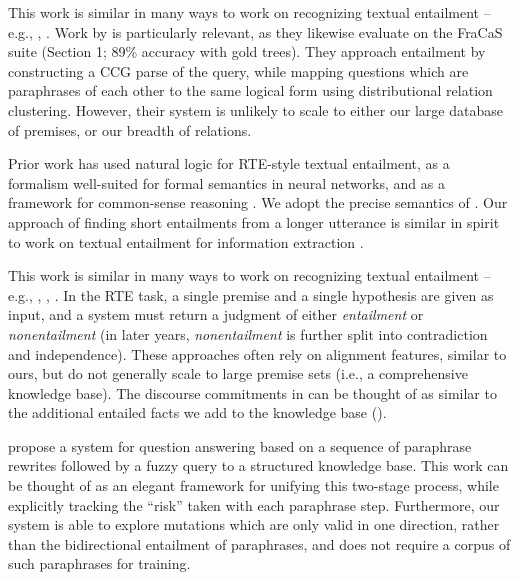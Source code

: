 This work is similar in many ways to work on 
  recognizing textual entailment -- e.g., 
  , .
Work by  is particularly relevant,
  as they likewise evaluate on the FraCaS suite (Section 1;
  89\% accuracy with gold trees).
They approach entailment by constructing a CCG parse of the query,
  while mapping questions which are paraphrases of each other to the
  same logical form using distributional relation clustering.
However, their system is unlikely to scale to either our large
  database of premises, or our breadth of relations.

Prior work has used natural logic
  for RTE-style textual entailment,
  as a formalism well-suited for formal semantics in neural networks,
  and as a framework for common-sense reasoning
  \cite{key:2009maccartney-natlog,key:2012watanabe-natlog,key:2014bowman-natlog,key:2014angeli-naturalli}.
We adopt the precise semantics of .
Our approach of finding short entailments from a longer utterance is similar
  in spirit to work on textual entailment for information extraction
  \cite{key:2006romano-ie}.

This work is similar in many ways to work on 
  recognizing textual entailment -- e.g., 
  , ,
  .
In the RTE task, a single premise and a single hypothesis are given as input,
  and a system must return a judgment of either \textit{entailment} or
  \textit{nonentailment} (in later years, \textit{nonentailment} is further
  split into contradiction and independence).
These approaches often rely on alignment features, similar to ours, but
  do not generally scale to large premise sets (i.e., a comprehensive
  knowledge base).
The discourse commitments in  can be thought
  of as similar to the additional entailed facts we add to the
  knowledge base ().



%
%
%

 propose a system for question answering
  based on a sequence of paraphrase rewrites followed by a fuzzy query to
  a structured knowledge base.
This work can be thought of as an elegant framework for unifying this
  two-stage process, while explicitly tracking the ``risk'' taken with
  each paraphrase step.
Furthermore, our system is able to explore mutations which are only
  valid in one direction, rather than the bidirectional entailment of
  paraphrases, and does not require a corpus of such paraphrases for
  training.


